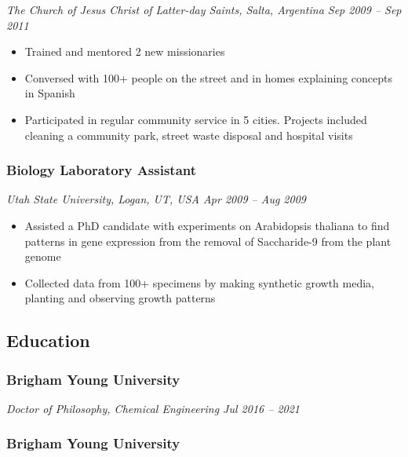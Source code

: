 \emph{The Church of Jesus Christ of Latter-day Saints, Salta, Argentina
\textbar{} Sep 2009 -- Sep 2011}

\begin{itemize}
\tightlist
\item
  Trained and mentored 2 new missionaries
\item
  Conversed with 100+ people on the street and in homes explaining
  concepts in Spanish
\item
  Participated in regular community service in 5 cities. Projects
  included cleaning a community park, street waste disposal and hospital
  visits
\end{itemize}

\hypertarget{biology-laboratory-assistant}{%
\subsubsection{Biology Laboratory
Assistant}\label{biology-laboratory-assistant}}

\emph{Utah State University, Logan, UT, USA \textbar{} Apr 2009 -- Aug
2009}

\begin{itemize}
\tightlist
\item
  Assisted a PhD candidate with experiments on Arabidopsis thaliana to
  find patterns in gene expression from the removal of Saccharide-9 from
  the plant genome
\item
  Collected data from 100+ specimens by making synthetic growth media,
  planting and observing growth patterns
\end{itemize}

\hypertarget{education}{%
\subsection{Education}\label{education}}

\hypertarget{brigham-young-university}{%
\subsubsection{Brigham Young
University}\label{brigham-young-university}}

\emph{Doctor of Philosophy, Chemical Engineering \textbar{} Jul 2016 --
2021}

\hypertarget{brigham-young-university-1}{%
\subsubsection{Brigham Young
University}\label{brigham-young-university-1}}

